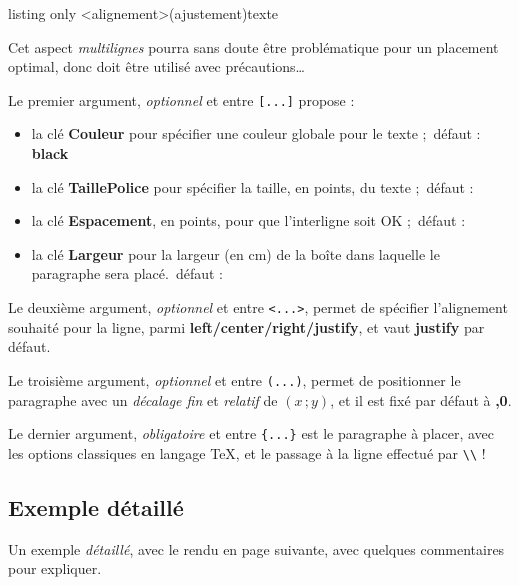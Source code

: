 \documentclass[a4paper]{article}
\newcommand\Cle[1]{{\bfseries\sffamily\textlangle #1\textrangle}}
\begin{document}
\begin{PresentationCode}{listing only}
\ParagraphePapierSeyes[options]<alignement>(ajustement){texte}
\end{PresentationCode}

\faBomb{} Cet aspect \textit{multilignes} pourra sans doute être problématique pour un placement optimal, donc doit être utilisé avec précautions\ldots

\smallskip

Le premier argument, \textit{optionnel} et entre \texttt{[...]} propose :

\begin{itemize}
	\item la clé \Cle{Couleur} pour spécifier une couleur globale pour le texte ;\hfill~défaut : \Cle{black}
	\item la clé \Cle{TaillePolice} pour spécifier la taille, en points, du texte ;\hfill~défaut : \Cle{1}
	\item la clé \Cle{Espacement}, en points, pour que l'interligne soit OK ;\hfill~défaut : \Cle{22.792}
	\item la clé \Cle{Largeur} pour la largeur (en cm) de la boîte dans laquelle le paragraphe sera placé.\hfill~défaut : \Cle{16.8}
\end{itemize}

Le deuxième argument, \textit{optionnel} et entre \texttt{<...>}, permet de spécifier l'alignement souhaité pour la ligne, parmi \Cle{left/center/right/justify}, et vaut \Cle{justify} par défaut.

\smallskip

Le troisième argument, \textit{optionnel} et entre \texttt{(...)}, permet de positionner le paragraphe avec un \textit{décalage fin} et \textit{relatif} de $(x\,;y)$, et il est fixé par défaut à \Cle{0,0}.

\smallskip

Le dernier argument, \textit{obligatoire} et entre \texttt{\{...\}} est le paragraphe à placer, avec les options classiques en langage \TeX{}, et le passage à la ligne effectué par \texttt{\textbackslash\textbackslash} !

\subsection{Exemple \og détaillé \fg}

Un exemple \textit{détaillé}, avec le rendu en page suivante, avec quelques commentaires pour expliquer.
\end{document}
